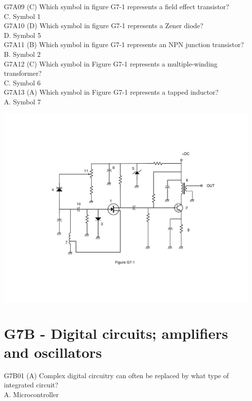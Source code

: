 \documentclass[12pt,letterpaper]{report}
\begin{document}
G7A09 (C) Which symbol in figure G7-1 represents a field effect transistor?\\
C. Symbol 1\\

G7A10 (D) Which symbol in figure G7-1 represents a Zener diode?\\
D. Symbol 5\\

G7A11 (B) Which symbol in figure G7-1 represents an NPN junction transistor?\\
B. Symbol 2\\

G7A12 (C) Which symbol in Figure G7-1 represents a multiple-winding transformer?\\
C. Symbol 6\\

G7A13 (A) Which symbol in Figure G7-1 represents a tapped inductor?\\
A. Symbol 7\\

\begin{center}
\includegraphics[width=\textwidth, keepaspectratio]{g7-1.pdf}
\end{center}

\section{G7B - Digital circuits; amplifiers and oscillators}

G7B01 (A) Complex digital circuitry can often be replaced by what type of integrated circuit?\\
A. Microcontroller\\
\end{document}
